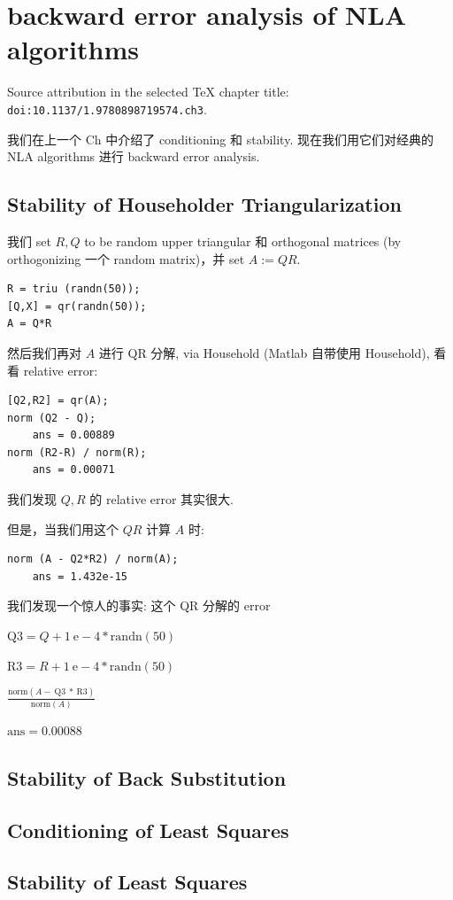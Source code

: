 \chapter{backward error analysis of NLA algorithms}

Source attribution in the selected TeX chapter title: \texttt{doi:10.1137/1.9780898719574.ch3}.

我们在上一个 Ch 中介绍了 conditioning 和 stability. 现在我们用它们对经典的 NLA algorithms 进行 backward error analysis.

\section{Stability of Householder Triangularization}

我们 set \(R,Q\) to be random upper triangular 和 orthogonal matrices (by orthogonizing 一个 random matrix)，并 set \(A := QR\).

\begin{verbatim}
R = triu (randn(50));
[Q,X] = qr(randn(50));
A = Q*R
\end{verbatim}

然后我们再对 \(A\) 进行 QR 分解, via Household (Matlab 自带使用 Household), 看看 relative error:

\begin{verbatim}
[Q2,R2] = qr(A);
norm (Q2 - Q);
    ans = 0.00889
norm (R2-R) / norm(R);
    ans = 0.00071
\end{verbatim}

我们发现 \(Q,R\) 的 relative error 其实很大.

但是，当我们用这个 \(QR\) 计算 \(A\) 时:

\begin{verbatim}
norm (A - Q2*R2) / norm(A);
    ans = 1.432e-15
\end{verbatim}

我们发现一个惊人的事实: 这个 QR 分解的 error

\(\text{Q3} = Q + 1\ \text{e} - 4 \ast \text{randn}(50)\)

\(\text{R3} = R + 1\ \text{e} - 4 \ast \text{randn}(50)\)

\(\frac{\text{norm}\left( {A - \ \text{Q3}\  \ast \ \text{R3}} \right)}{\text{norm}(A)}\)

\(\text{ans} = 0.00088\)

\section{Stability of Back Substitution}

\section{Conditioning of Least Squares}

\section{Stability of Least Squares}
